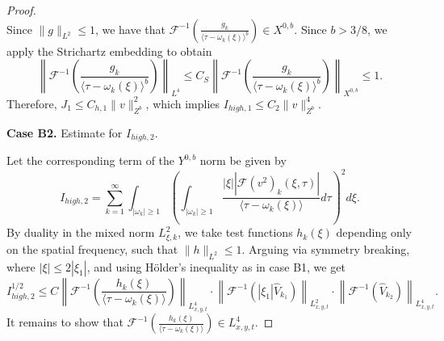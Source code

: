 \documentclass[10pt,a4paper]{amsart}
\begin{document}
\begin{proof}
\begin{equation}
\end{equation}
Since $\|g\|_{L^{2}} \le 1$, we have that $\mathcal{F}^{-1}\left(\frac{g_{k}}{\langle \tau - \omega_{k}(\xi) \rangle^{b}}\right) \in X^{0,b}$. Since $b > 3/8$, we apply the Strichartz embedding to obtain
\begin{equation}
\left\|\mathcal{F}^{-1}\left(\frac{g_{k}}{\langle \tau - \omega_{k}(\xi) \rangle^{b}}\right)\right\|_{L^4} \le C_{S}\left\|\mathcal{F}^{-1}\left(\frac{g_{k}}{\langle \tau - \omega_{k}(\xi) \rangle^{b}}\right)\right\|_{X^{0,b}} \le 1.\end{equation}
Therefore, $J_{1} \le C_{h,1}\|v\|_{Z^{b}}^{2}$, which implies $I_{high,1} \le C_{2}\|v\|_{Z^{b}}^{4}$.

\textbf{Case B2.} Estimate for $I_{high,2}$.

Let the corresponding term of the $Y^{0,b}$ norm be given by
\begin{equation}
I_{high,2} = \sum_{k=1}^{\infty} \int_{|\omega_{k}| \ge 1} \left( \int_{|\omega_{k}| \ge 1} \frac{|\xi| |\mathcal{F}(v^{2})_{k}(\xi,\tau)|}{\langle \tau - \omega_{k}(\xi) \rangle} d\tau \right)^{2} d\xi.
\end{equation}
By duality in the mixed norm $L^{2}_{\xi, k}$, we take test
functions $h_{k}(\xi)$ depending only on the spatial frequency, such
that $\|h\|_{L^{2}} \le 1$. Arguing via symmetry breaking, where
$|\xi| \le 2|\xi_{1}|$, and using Hölder's inequality as in case
B1, we get
\begin{equation}
I_{high,2}^{1/2} \le C\left\|\mathcal{F}^{-1} \left( \frac{h_{k}(\xi)}{\langle \tau - \omega_{k}(\xi) \rangle} \right)\right\|_{L^{4}_{x,y,t}} \cdot \left\|\mathcal{F}^{-1}\left(|\xi_1| \widehat{V}_{k_{1}}\right)\right\|_{L^{2}_{x,y,t}} \cdot \left\|\mathcal{F}^{-1}\left(\widehat{V}_{k_{2}}\right)\right\|_{L^{4}_{x,y,t}}.
\end{equation}
It remains to show that $\mathcal{F}^{-1} \left(
\frac{h_{k}(\xi)}{\langle \tau - \omega_{k}(\xi) \rangle} \right)
\in L^{4}_{x,y,t}$.










\end{proof}
\end{document}
